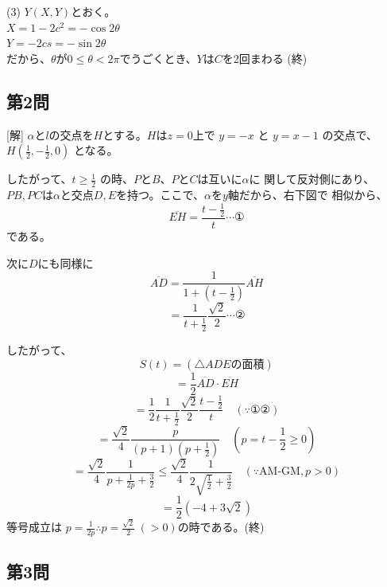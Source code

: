 \documentclass[../main.tex]{subfiles}
\begin{document}
(3) $Y(X,Y)$とおく。\\
$X = 1-2c^2 = -\cos 2\theta$ \\
$Y = -2cs = -\sin 2\theta$ \\
だから、$\theta$が$0 \le \theta < 2\pi$でうごくとき、$Y$は$C$を2回まわる \hfill(終)

\subsection*{第2問}
[解] $\alpha$と$l$の交点を$H$とする。$H$は$z=0$上で
$y = -x$ と $y = x - 1$ の交点で、$H(\frac{1}{2}, -\frac{1}{2}, 0)$ となる。

したがって、$t \ge \frac{1}{2}$ の時、$P$と$B$、$P$と$C$は互いに$\alpha$に
関して反対側にあり、$PB, PC$は$\alpha$と交点$D, E$を持つ。ここで、$\alpha$を$y$軸だから、右下図で
相似から、
\[ \overline{EH} = \frac{t - \frac{1}{2}}{t} \cdots \text{①} \]
である。

次に$D$にも同様に
\[ \overline{AD} = \frac{1}{1 + (t - \frac{1}{2})} \overline{AH} \]
\[ = \frac{1}{t + \frac{1}{2}} \frac{\sqrt{2}}{2} \cdots \text{②} \]

したがって、
\[ S(t) = (\triangle ADE \text{の面積}) \]
\[ = \frac{1}{2} \overline{AD} \cdot \overline{EH} \]
\[ = \frac{1}{2} \frac{1}{t + \frac{1}{2}} \frac{\sqrt{2}}{2} \frac{t - \frac{1}{2}}{t} \quad (\because \text{①②}) \]
\[ = \frac{\sqrt{2}}{4} \frac{p}{(p + 1)(p + \frac{1}{2})} \quad (p = t - \frac{1}{2} \ge 0) \]
\[ = \frac{\sqrt{2}}{4} \frac{1}{p + \frac{1}{2p} + \frac{3}{2}} \le \frac{\sqrt{2}}{4} \frac{1}{2\sqrt{\frac{1}{2}} + \frac{3}{2}} \quad (\because \text{AM-GM}, p > 0) \]
\[ = \frac{1}{2}(-4 + 3\sqrt{2}) \]
等号成立は $p = \frac{1}{2p} \therefore p = \frac{\sqrt{2}}{2} \ (>0)$の時である。\hfill(終)

\begin{center}
\end{center}

\subsection*{第3問}
\end{document}
